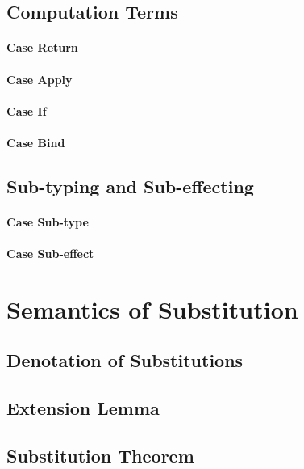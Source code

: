 \documentclass{report}
\begin{document}
\subsection{Computation Terms}
\paragraph{Case Return}
  
\paragraph{Case Apply}
    
\paragraph{Case If}
   
\paragraph{Case Bind}
    
\subsection{Sub-typing and Sub-effecting}
\paragraph{Case Sub-type}
    
\paragraph{Case Sub-effect}

\section{Semantics of Substitution}
\subsection{Denotation of Substitutions}

\subsection{Extension Lemma}

\subsection{Substitution Theorem}
\end{document}
